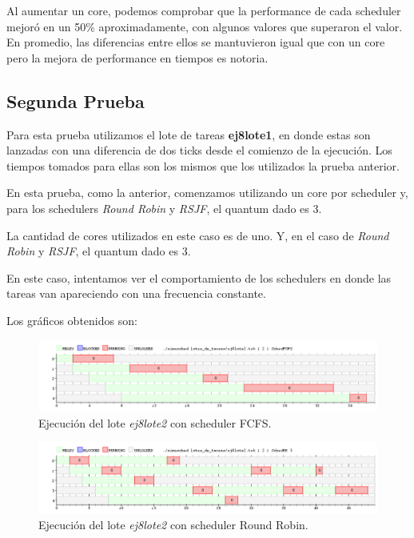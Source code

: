 Al aumentar un core, podemos comprobar que la performance de cada scheduler mejoró en un 50\% aproximadamente, con algunos valores que superaron el valor. En promedio, las diferencias entre ellos se mantuvieron igual que con un core pero la mejora de performance en tiempos es notoria.

\subsection{Segunda Prueba}

Para esta prueba utilizamos el lote de tareas \textbf{ej8lote1}, en donde estas son lanzadas con una diferencia de dos ticks desde el comienzo de la ejecución. Los tiempos tomados para ellas son los mismos que los utilizados la prueba anterior.

En esta prueba, como la anterior, comenzamos utilizando un core por scheduler y, para los schedulers \emph{Round Robin} y \emph{RSJF}, el quantum dado es 3.

La cantidad de cores utilizados en este caso es de uno. Y, en el caso de \emph{Round Robin} y \emph{RSJF}, el quantum dado es 3.

En este caso, intentamos ver el comportamiento de los schedulers en donde las tareas van apareciendo con una frecuencia constante.

Los gráficos obtenidos son:

\begin{figure}[!h]
	\begin{center}
		\includegraphics[width=500px]{imagenes/ej8_prueba2_fcfs.png}
		\caption{Ejecución del lote \emph{ej8lote2} con scheduler FCFS.}
		\label{fig:grafico_ej8_prueba2_fcfs}
	\end{center}
\end{figure}

\begin{figure}[!h]
	\begin{center}
		\includegraphics[width=500px]{imagenes/ej8_prueba2_rr.png}
		\caption{Ejecución del lote \emph{ej8lote2} con scheduler Round Robin.}
		\label{fig:grafico_ej8_prueba2_rr}
	\end{center}
\end{figure}

